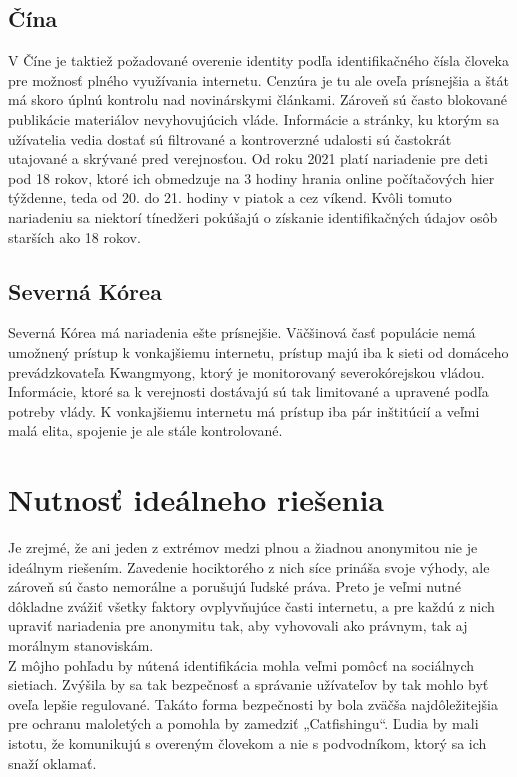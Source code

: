 \documentclass{article}
\begin{document}
\subsection{Čína}

V Číne je taktiež požadované overenie identity podľa identifikačného čísla človeka pre možnosť plného využívania internetu. Cenzúra je tu ale oveľa prísnejšia a štát má skoro úplnú kontrolu nad novinárskymi článkami. Zároveň sú často blokované publikácie materiálov nevyhovujúcich vláde. Informácie a stránky, ku ktorým sa užívatelia vedia dostať sú filtrované a  kontroverzné udalosti sú častokrát utajované a skrývané pred verejnosťou. Od roku 2021 platí nariadenie pre deti pod 18 rokov, ktoré ich obmedzuje na 3 hodiny hrania online počítačových hier týždenne, teda od 20. do 21. hodiny v piatok a cez víkend. Kvôli tomuto nariadeniu sa niektorí tínedžeri pokúšajú o získanie identifikačných údajov osôb starších ako 18 rokov.~\cite{wiki-china, china-game-limit}\\

\subsection{Severná Kórea}

Severná Kórea má nariadenia ešte prísnejšie. Väčšinová časť populácie nemá umožnený prístup k vonkajšiemu internetu, prístup majú iba k sieti od domáceho prevádzkovateľa Kwangmyong, ktorý je monitorovaný severokórejskou vládou. Informácie, ktoré sa k verejnosti dostávajú sú tak limitované a upravené podľa potreby vlády.  K vonkajšiemu internetu má prístup iba pár inštitúcií a veľmi malá elita, spojenie je ale stále kontrolované.~\cite{wiki-nk-i, wiki-nk-c}\\

\section{Nutnosť ideálneho riešenia}

Je zrejmé, že ani jeden z extrémov medzi plnou a žiadnou anonymitou nie je ideálnym riešením. Zavedenie hociktorého z nich síce prináša svoje výhody, ale zároveň sú často nemorálne a porušujú ľudské práva. Preto je veľmi nutné dôkladne zvážiť všetky faktory ovplyvňujúce časti internetu, a pre každú z nich upraviť nariadenia pre anonymitu tak, aby vyhovovali ako právnym, tak aj morálnym stanoviskám.\\

Z môjho pohľadu by nútená identifikácia mohla veľmi pomôcť na sociálnych sietiach. Zvýšila by sa tak bezpečnosť a správanie užívateľov by tak mohlo byť oveľa lepšie regulované. Takáto forma bezpečnosti by bola zväčša najdôležitejšia pre ochranu maloletých a pomohla by zamedziť „Catfishingu“. Ľudia by mali istotu, že komunikujú s overeným človekom a nie s podvodníkom, ktorý sa ich snaží oklamať.\\
\end{document}

